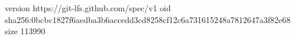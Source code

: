 version https://git-lfs.github.com/spec/v1
oid sha256:0bcbc1827f6aedba3b6accedd3cd8258cf12c6a731615248a7812647a3f82e68
size 113990
